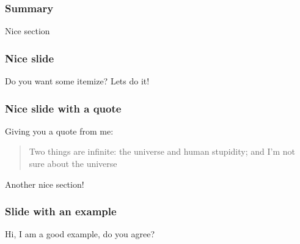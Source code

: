 \documentclass[xcolor=dvipsnames,aspectratio=169]{beamer}
\begin{document}
{




\begin{frame}[t] %
\frametitle{Summary}
\tableofcontents
\end{frame}


\begin{section}{Nice section}
\begin{frame}[t]
\frametitle{Nice slide}
Do you want some itemize? Lets do it!
\begin{itemize}
\end{itemize}
\end{frame}

\begin{frame}[t]
\frametitle{Nice slide with a quote}
Giving you a quote from me:
\begin{quote}
\textcolor{RedEurac}{Two things are infinite: the universe and human stupidity; and I'm not sure about the universe} %
\end{quote} 
\end{frame}
\end{section}

\begin{section}{Another nice section!}
\begin{frame}[t]
\frametitle{Slide with an example}
\begin{example}
Hi, I am a good example, do you agree?
\end{example}
\end{frame}


\end{section}}
\end{document}
